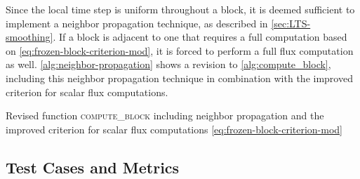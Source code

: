 Since the local time step is uniform throughout a block, it is deemed sufficient to implement a neighbor propagation technique, as described in \autoref{sec:LTS-smoothing}.
If a block is adjacent to one that requires a full computation based on \autoref{eq:frozen-block-criterion-mod}, it is forced to perform a full flux computation as well.
\autoref{alg:neighbor-propagation} shows a revision to \autoref{alg:compute_block}, including this neighbor propagation technique in combination with the improved criterion for scalar flux computations.
\begin{algorithm} [htbp]
  \caption{Revised function \textsc{compute\_block} including neighbor propagation and the improved criterion for scalar flux computations \autoref{eq:frozen-block-criterion-mod}}
  \label{alg:neighbor-propagation}
  \begin{algorithmic}[1]
    \small


      \State {}
      \Else
      \State {}
      \EndIf

    \EndFunction
  \end{algorithmic}
\end{algorithm}

\FloatBarrier


\FloatBarrier
\subsection{Test Cases and Metrics}
\label{sec:test-cases-metrics}

